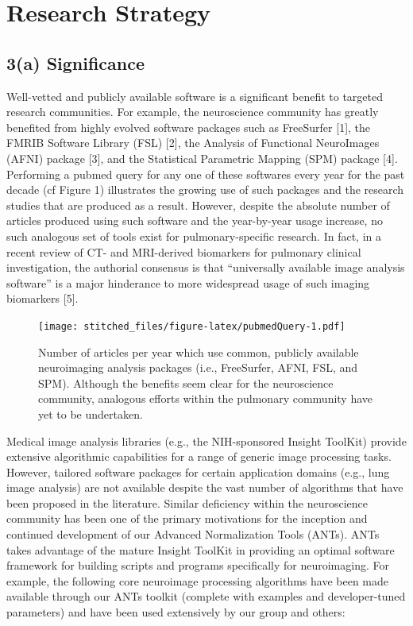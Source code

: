 \documentclass[11pt,]{article}
\begin{document}
\newpage

\section{Research Strategy}\label{research-strategy}

\subsection{\textbf{3(a) Significance}}\label{a-significance}

Well-vetted and publicly available software is a significant benefit to
targeted research communities. For example, the neuroscience community
has greatly benefited from highly evolved software packages such as
FreeSurfer {[}1{]}, the FMRIB Software Library (FSL) {[}2{]}, the
Analysis of Functional NeuroImages (AFNI) package {[}3{]}, and the
Statistical Parametric Mapping (SPM) package {[}4{]}. Performing a
pubmed query for any one of these softwares every year for the past
decade (cf Figure 1) illustrates the growing use of such packages and
the research studies that are produced as a result. However, despite the
absolute number of articles produced using such software and the
year-by-year usage increase, no such analogous set of tools exist for
pulmonary-specific research. In fact, in a recent review of CT- and
MRI-derived biomarkers for pulmonary clinical investigation, the
authorial consensus is that ``universally available image analysis
software'' is a major hinderance to more widespread usage of such
imaging biomarkers {[}5{]}.

\begin{figure}[htbp]
\centering
\texttt{[image: stitched\_files/figure-latex/pubmedQuery-1.pdf]}
\caption{Number of articles per year which use common, publicly
available neuroimaging analysis packages (i.e., FreeSurfer, AFNI, FSL,
and SPM). Although the benefits seem clear for the neuroscience
community, analogous efforts within the pulmonary community have yet to
be undertaken.}
\end{figure}

Medical image analysis libraries (e.g., the NIH-sponsored Insight
ToolKit) provide extensive algorithmic capabilities for a range of
generic image processing tasks. However, tailored software packages for
certain application domains (e.g., lung image analysis) are not
available despite the vast number of algorithms that have been proposed
in the literature. Similar deficiency within the neuroscience community
has been one of the primary motivations for the inception and continued
development of our Advanced Normalization Tools (ANTs). ANTs takes
advantage of the mature Insight ToolKit in providing an optimal software
framework for building scripts and programs specifically for
neuroimaging. For example, the following core neuroimage processing
algorithms have been made available through our ANTs toolkit (complete
with examples and developer-tuned parameters) and have been used
extensively by our group and others:
\end{document}
